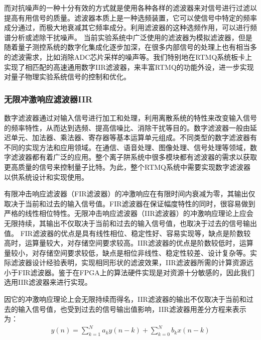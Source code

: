 而对抗噪声的一种十分有效的方式就是使用各种各样的滤波器来对信号进行过滤以提高有用信号的质量。滤波器本质上是一种选频装置，它可以使信号中特定的频率成分通过，而极大地衰减其它频率成分。利用滤波器的这种选频作用，可以进行频谱分析或滤除干扰噪声。
当前实验系统中广泛使用的滤波器为模拟滤波器，但是随着量子测控系统的数字化集成化逐步加深，在很多内部信号的处理上也有相当多的滤波需求，比如消除ADC芯片采样的噪声等。我们特别地在RTMQ系统板卡上实现了相匹配的高速通用数字IIR滤波器，来丰富RTMQ的功能外设，进一步实现对量子物理实验系统信号的控制和优化。


\subsubsection[无限冲激响应滤波器IIR]{无限冲激响应滤波器IIR}
数字滤波器通过对输入信号进行加工和处理，利用离散系统的特性来改变输入信号的频率特性，从而达到选频、提高信噪比、消除干扰等目的。数字滤波器一般由延迟单元、加法器、乘法器、寄存器等基本运算单元组成。不同类型的数字滤波器有不同的实现方法和应用领域。在通信、语音处理、图像处理、信号处理等领域，数字滤波器都有着广泛的应用。整个离子阱系统中很多模块都有滤波器的需求以获取更高质量的信号来控制量子比特。为此，整个RTMQ系统中需要实现数字滤波器以供系统设计和实现使用。

有限冲击响应滤波器（FIR滤波器）的冲激响应在有限时间内衰减为零，其输出仅取决于当前和过去的输入信号值。FIR滤波器在保证幅度特性的同时，很容易做到严格的线性相位特性。无限冲击响应滤波器（IIR滤波器）的冲激响应理论上应会无限持续，其输出不仅取决于当前和过去的输入信号值，也取决于过去的信号输出值。
FIR滤波器的优点是具有线性相位、稳定性好、容易实现等，缺点是阶数较高时，运算量较大，对存储空间要求较高。IIR滤波器的优点是阶数较低时，运算量较小，对存储空间要求较低，缺点是相位非线性、稳定性较差、设计复杂等。实际滤波器设计经验表明，实现相同形状的滤波效果，IIR滤波器所需的计算资源远小于FIR滤波器。鉴于在FPGA上的算法硬件实现是对资源十分敏感的，因此我们选用IIR滤波器来进行实现。

因它的冲激响应理论上会无限持续而得名，IIR滤波器的输出不仅取决于当前和过去的输入信号值，也受到过去的信号输出值影响，IIR滤波器用差分方程来表示为：
\begin{align}
    y(n)=\sum_{k=1}^Na_ky(n-k)+\sum_{k=0}^Nb_kx(n-k)\label{eq:iir_filter}
\end{align}


